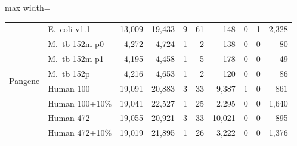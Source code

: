 \begin{table}[ht]
\begin{adjustbox}{max width=\linewidth}
\begin{tabular}{l l r r r r r r r r}
\hline
\multirow{8}{*}{\textsf{Pangene}} & \textsf{E.~coli v1.1} & 13,009 & 19,433 & 9 & 61 & 148 & 0 & 1 & 2,328 \\
 & \textsf{M.~tb 152m p0} & 4,272 & 4,724 & 1 & 2 & 138 & 0 & 0 & 80 \\
 & \textsf{M.~tb 152m p1} & 4,195 & 4,458 & 1 & 5 & 178 & 0 & 0 & 49 \\
 & \textsf{M.~tb 152p} & 4,216 & 4,653 & 1 & 2 & 120 & 0 & 0 & 86 \\
 & \textsf{Human 100} & 19,091 & 20,883 & 3 & 33 & 9,387 & 1 & 0 & 861 \\
 & \textsf{Human 100+10\%} & 19,041 & 22,527 & 1 & 25 & 2,295 & 0 & 0 & 1,640 \\
 & \textsf{Human 472} & 19,055 & 20,921 & 3 & 33 & 10,021 & 0 & 0 & 895 \\
 & \textsf{Human 472+10\%} & 19,019 & 21,895 & 1 & 26 & 3,222 & 0 & 0 & 1,376 \\
\bottomrule
\end{tabular}
\end{adjustbox}
\end{table}

